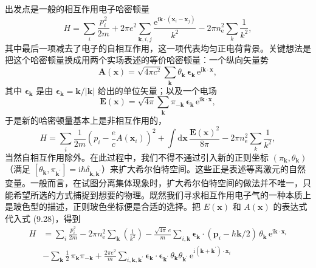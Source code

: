 出发点是一般的相互作用电子哈密顿量
\begin{equation*}
H=\sum_i\frac{p_i^2}{2m}+2\pi e^2\sum_{\mathbf{k},i,j}\frac{\mathrm{e}^{\mathrm{i}\mathbf{k}\cdot(\mathbf{x}_i-\mathbf{x}_j)}}{k^2}-2\pi n_{\mathrm{e}}^2\sum_k\frac{1}{k^2},
\end{equation*}
其中最后一项减去了电子的自相互作用，这一项代表均匀正电荷背景。关键想法是把这个哈密顿量换成用两个实场表述的等价哈密顿量：一个纵向矢量势
\begin{equation*}
\mathbf{A}(\mathbf{x})=\sqrt{4\pi c^2}\sum_{\mathbf{k}}\theta_{\mathbf{k}}\,\boldsymbol{\epsilon}_{\mathbf{k}}\,\mathrm{e}^{\mathrm{i}\mathbf{k}\cdot\mathbf{x}},\tag{9.26}
\end{equation*}
其中 $\boldsymbol{\epsilon}_{\mathbf{k}}$ 是由 $\boldsymbol{\epsilon}_{\mathbf{k}}=\mathbf{k}/|\mathbf{k}|$ 给出的单位矢量；以及一个电场
\begin{equation*}
\mathbf{E}(\mathbf{x})=\sqrt{4\pi}\sum_{\mathbf{k}}\pi_{-\mathbf{k}}\,\boldsymbol{\epsilon}_{\mathbf{k}}\,\mathrm{e}^{\mathrm{i}\mathbf{k}\cdot\mathbf{x}},\tag{9.27}
\end{equation*}
于是新的哈密顿量基本上是非相互作用的，
\begin{equation*}
H=\sum_i\frac{1}{2m}\left(p_i-\frac{e}{c}A(\mathbf{x}_i)\right)^{\!2}+\int\mathrm{d}\mathbf{x}\,\frac{\mathbf{E}(\mathbf{x})^2}{8\pi}-2\pi n_{\mathrm{e}}^2\sum_k\frac{1}{k^2},\tag{9.28}
\end{equation*}
当然自相互作用除外。在此过程中，我们不得不通过引入新的正则坐标 $(\pi_{\mathbf{k}},\theta_{\mathbf{k}})$（满足 $[\theta_{\mathbf{k}},\pi_{\mathbf{k}^{\prime}}]=\mathrm{i}\hbar\delta_{\mathbf{k},\mathbf{k}^{\prime}}$）来扩大希尔伯特空间。这些正是表述等离激元的自然变量。一般而言，在试图分离集体现象时，扩大希尔伯特空间的做法并不唯一，只能希望所选的方式捕捉到想要的物理。既然我们寻求相互作用电子气的一种本质上是玻色型的描述，正则玻色坐标便是合适的选择。把 $E(\mathbf{x})$ 和 $A(\mathbf{x})$ 的表达式代入式 (9.28)，得到
\begin{equation*}
\begin{aligned}
H&=\sum_i\frac{p_i^2}{2m}-2\pi n_{\mathrm{e}}^2\sum_{\mathbf{k}}\left(\frac{1}{k^2}\right)-\frac{\sqrt{4\pi}\,e}{m}\sum_{i,\mathbf{k}}\boldsymbol{\epsilon}_{\mathbf{k}}\cdot(\mathbf{p}_i-\hbar\mathbf{k}/2)\,\theta_{\mathbf{k}}\,\mathrm{e}^{\mathrm{i}\mathbf{k}\cdot\mathbf{x}_i}\\
&-\sum_{\mathbf{k}}\frac{1}{2}\,\pi_{\mathbf{k}}\pi_{-\mathbf{k}}+\frac{2\pi e^2}{m}\sum_{i,\mathbf{k},\mathbf{k}^{\prime}}\boldsymbol{\epsilon}_{\mathbf{k}}\cdot\boldsymbol{\epsilon}_{\mathbf{k}^{\prime}}\,\theta_{\mathbf{k}}\theta_{\mathbf{k}^{\prime}}\,\mathrm{e}^{\mathrm{i}(\mathbf{k}+\mathbf{k}^{\prime})\cdot\mathbf{x}_i}
\end{aligned}\tag{9.29}
\end{equation*}
